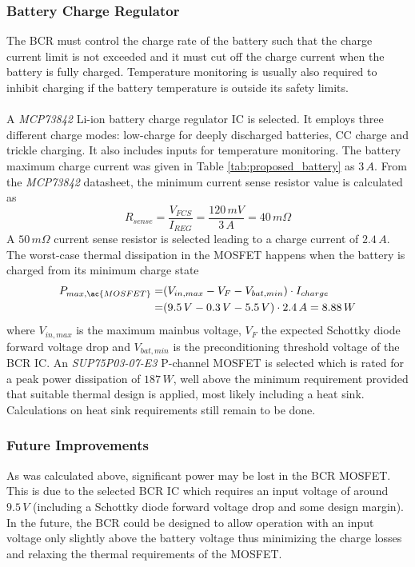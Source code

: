 \subsubsection{Battery Charge Regulator}
\label{subsec:BCR}
%
The \ac{BCR} must control the charge rate of the battery such that the charge current limit is not exceeded and it must cut off the charge current when the battery is fully charged. Temperature monitoring is usually also required to inhibit charging if the battery temperature is outside its safety limits. 
\\
\\
A \textit{MCP73842} Li-ion battery charge regulator \ac{IC} is selected. It employs three different charge modes: low-charge for deeply discharged batteries, \ac{CC} charge and trickle charging. It also includes inputs for temperature monitoring. The battery maximum charge current was given in Table \ref{tab:proposed_battery} as $3\,A$. From the \textit{MCP73842} datasheet, the minimum current sense resistor value is calculated as
%
\begin{equation}
R_{sense}=\dfrac{V_{FCS}}{I_{REG}}=\dfrac{120\,mV}{3\,A}=40\,m\Omega
\end{equation}
%
A $50\,m \Omega$ current sense resistor is selected leading to a charge current of $2.4\,A$.
%
The worst-case thermal dissipation in the \ac{MOSFET} happens when the battery is charged from its minimum charge state
%
\begin{equation}
\begin{split}
P_{max,\ac{MOSFET}}=&(V_{in,max}-V_F-V_{bat,min})\cdot I_{charge}\\
=&(9.5\,V-0.3\,V-5.5\,V)\cdot 2.4\,A=8.88\,W
\end{split}
\end{equation}
%
where $V_{in,max}$ is the maximum mainbus voltage, $V_F$ the expected Schottky diode forward voltage drop and $V_{bat,min}$ is the preconditioning threshold voltage of the \ac{BCR} \ac{IC}.
An \textit{SUP75P03-07-E3} P-channel \ac{MOSFET} is selected which is rated for a peak power dissipation of $187\,W$, well above the minimum requirement provided that suitable thermal design is applied, most likely including a heat sink. Calculations on heat sink requirements still remain to be done.
%
\subsubsection*{Future Improvements}
As was calculated above, significant power may be lost in the \ac{BCR} \ac{MOSFET}. This is due to the selected \ac{BCR} \ac{IC} which requires an input voltage of around $9.5\,V$ (including a Schottky diode forward voltage drop and some design margin). In the future, the \ac{BCR} could be designed to allow operation with an input voltage only slightly above the battery voltage thus minimizing the charge losses and relaxing the thermal requirements of the \ac{MOSFET}.
%
%
